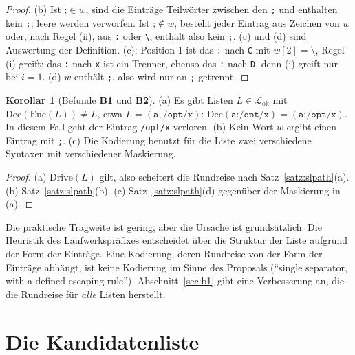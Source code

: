 \documentclass[a4paper,12pt,twoside]{report}
\DeclareRobustCommand{\_}{\ifmmode\mbox{\textunderscore}\else\textunderscore\allowbreak{}\fi}
\theoremstyle{definition}
\newtheorem{korollar}{Korollar}[chapter]
\newcommand{\Bf}[1]{\textbf{B#1}}
\begin{document}
\begin{proof}
	(b) Ist $\texttt{;}\in w$, sind die Einträge Teilwörter zwischen den \texttt{;} und enthalten kein \texttt{;}; leere werden verworfen. Ist $\texttt{;}\notin w$, besteht jeder Eintrag aus Zeichen von $w$ oder, nach Regel (ii), aus \texttt{:} oder \texttt{\textbackslash}, enthält also kein \texttt{;}. (c) und (d) sind Auswertung der Definition. (c): Position $1$ ist das \texttt{:} nach \texttt{C} mit $w[2]=\texttt{\textbackslash}$, Regel (i) greift; das \texttt{:} nach \texttt{x} ist ein Trenner, ebenso das \texttt{:} nach \texttt{D}, denn (i) greift nur bei $i=1$. (d) $w$ enthält \texttt{;}, also wird nur an \texttt{;} getrennt.
\end{proof}

\begin{korollar}[Befunde \Bf{1} und \Bf{2}]
	\label{kor:slpath}
	(a) Es gibt Listen $L\in\mathcal L_{\mathrm{ok}}$ mit $\mathrm{Dec}(\mathrm{Enc}(L))\ne L$, etwa $L=(\texttt{a},\texttt{/opt/x})$: $\mathrm{Dec}(\texttt{a:/opt/x})=(\texttt{a:/opt/x})$. In diesem Fall geht der Eintrag \texttt{/opt/x} verloren. (b) Kein Wort $w$ ergibt einen Eintrag mit \texttt{;}. (c) Die Kodierung benutzt für die Liste zwei verschiedene Syntaxen mit verschiedener Maskierung.
\end{korollar}

\begin{proof}
	(a) $\mathrm{Drive}(L)$ gilt, also scheitert die Rundreise nach Satz~\ref{satz:slpath}(a). (b) Satz~\ref{satz:slpath}(b). (c) Satz~\ref{satz:slpath}(d) gegenüber der Maskierung in (a).
\end{proof}

Die praktische Tragweite ist gering, aber die Ursache ist grundsätzlich: Die Heuristik des Laufwerkspräfixes entscheidet über die Struktur der Liste aufgrund der Form der Einträge. Eine Kodierung, deren Rundreise von der Form der Einträge abhängt, ist keine Kodierung im Sinne des Proposals (``single separator, with a defined escaping rule''). Abschnitt~\ref{sec:b1} gibt eine Verbesserung an, die die Rundreise für \emph{alle} Listen herstellt.

\section{Die Kandidatenliste}
\end{document}
